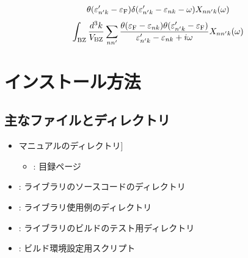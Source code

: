 \documentclass[letterpaper,10pt,dvipdfmx,openany]{sphinxmanual}
\begin{document}
\begin{equation*}
\begin{split}
\begin{align}
\theta(\varepsilon'_{n' k} - \varepsilon_{\rm F})
\delta(\varepsilon'_{n' k} - \varepsilon_{n k} - \omega)
X_{n n' k}(\omega)
\end{align}\end{split}
\end{equation*}\begin{equation*}
\begin{split}\begin{align}
\int_{\rm BZ} \frac{d^3 k}{V_{\rm BZ}}
\sum_{n n'}
\frac{
\theta(\varepsilon_{\rm F} - \varepsilon_{n k})
\theta(\varepsilon'_{n' k} - \varepsilon_{\rm F})}
{\varepsilon'_{n' k} - \varepsilon_{n k} + i \omega}
X_{n n' k}(\omega)
\end{align}\end{split}
\end{equation*}
\sphinxstepscope


\chapter{インストール方法}
\label{\detokenize{install:id1}}\label{\detokenize{install::doc}}

\section{主なファイルとディレクトリ}
\label{\detokenize{install:id2}}\begin{itemize}
\item {} \begin{description}
\sphinxlineitem{\sphinxcode{\sphinxupquote{doc/}}}{[}マニュアルのディレクトリ{]}\begin{itemize}
\item {} 
\sphinxAtStartPar
{} : 目録ページ

\end{itemize}

\end{description}

\item {} 
\sphinxAtStartPar
{} : ライブラリのソースコードのディレクトリ

\item {} 
\sphinxAtStartPar
{} : ライブラリ使用例のディレクトリ

\item {} 
\sphinxAtStartPar
{} : ライブラリのビルドのテスト用ディレクトリ

\item {} 
\sphinxAtStartPar
{} : ビルド環境設定用スクリプト

\end{itemize}
\end{document}
